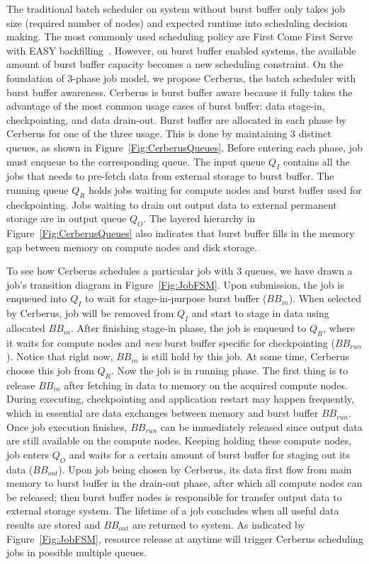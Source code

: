 The traditional batch scheduler on system without burst buffer only
takes job size (required number of nodes) and expected runtime into scheduling decision making. 
The most commonly used scheduling policy are First Come First Serve with
EASY backfilling~\cite{tsafrir-tpds-2007}.
However, on burst buffer enabled systems, 
the available amount of burst buffer capacity becomes a new scheduling constraint.
On the foundation of 3-phase job model,
we propose Cerberus, the batch scheduler with burst buffer awareness.
Cerberus is burst buffer aware because it fully takes the advantage of the 
most common usage cases of burst buffer: data stage-in, checkpointing, and data drain-out.
Burst buffer are allocated in each phase by Cerberus for one of the three usage.
This is done by maintaining 3 distinct queues, as shown in Figure~\ref{Fig:CerberusQueues},
Before entering each phase, job must enqueue to the corresponding queue.
The input queue $Q_I$ contains all the jobs that
needs to pre-fetch data from external storage to burst buffer.
The running queue $Q_R$ holds jobs
waiting for compute nodes and burst buffer used for checkpointing.
Jobs waiting to drain out output data to external permanent storage are in output queue $Q_O$.
The layered hierarchy in Figure~\ref{Fig:CerberusQueues} also indicates that
burst buffer fills in the memory gap between memory on compute nodes and disk storage.

To see how Cerberus schedules a particular job with 3 queues,
we have drawn a job's transition diagram in Figure~\ref{Fig:JobFSM}.
Upon submission, the job is enqueued into $Q_I$ to wait for stage-in-purpose burst buffer ($BB_{in}$).
When selected by Cerberus, job will be removed from $Q_I$ and
start to stage in data using allocated $BB_{in}$.
After finishing stage-in phase, the job is enqueued to $Q_R$, where it waits for
compute nodes and \textit{new} burst buffer specific for checkpointing ($BB_{run}$).
Notice that right now, $BB_{in}$ is still hold by this job.
At some time, Cerberus choose this job from $Q_R$.
Now the job is in running phase.
The first thing is to release $BB_{in}$ after fetching in data to memory on the acquired compute nodes.
During executing, checkpointing and application restart may happen frequently, which in essential
are data exchanges between memory and burst buffer $BB_{run}$.
Once job execution finishes, $BB_{run}$ can be immediately released since
output data are still available on the compute nodes.
Keeping holding these compute nodes, job enters $Q_O$ and waits for a certain amount of burst
buffer for staging out its data ($BB_{out}$).
Upon job being chosen by Cerberus, its data first flow from main memory to burst buffer
in the drain-out phase, after which all compute nodes can be released;
then burst buffer nodes is responsible for transfer output data to external storage system.
The lifetime of a job concludes when all useful data results are stored
and $BB_{out}$ are returned to system.
As indicated by Figure~\ref{Fig:JobFSM}, resource release at anytime will trigger Cerberus
scheduling jobs in possible multiple queues.

